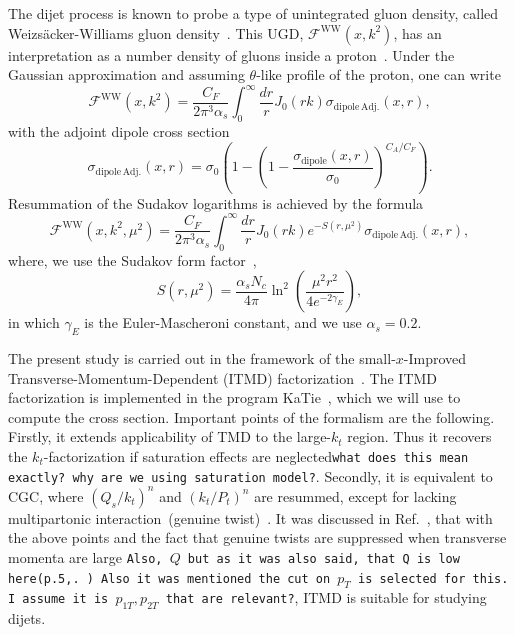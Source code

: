 \documentclass[12pt]{article}
\numberwithin{equation}{section}
\numberwithin{table}{section}
\numberwithin{figure}{section}
\newcommand{\fww}[0]{\mathcal{F}^{\mathrm{WW}}}
\newcommand{\sdp}[0]{\sigma_{\mathrm{dipole}}}
\newcommand{\sdpa}[0]{\sigma_{\mathrm{dipole\,Adj.}}}
\newcommand{\comment}[1]{\texttt{\color{red}#1}}
\begin{document}
The dijet process is known to probe a type of unintegrated gluon density, called Weizs\"acker-Williams gluon density~\cite{Dominguez:2010xd,Dominguez:2011wm,Xiao:2017ggh}.
This UGD, $\fww(x,k^2)$, has an interpretation as a number density of gluons inside a proton~\cite{Dominguez:2010xd,Dominguez:2011wm}. Under the Gaussian approximation and assuming $\theta$-like profile of the proton, one can write~\cite{vanHameren:2016ftb,Xiao:2017ggh,Dominguez:2010xd,Dominguez:2011wm}
\begin{equation}
\fww(x,k^2)= \frac{C_F}{2\pi^3\alpha_s}\int^\infty_0\frac{dr}{r}J_0(r k) \sdpa(x,r),
\end{equation} 	
with the adjoint dipole cross section
\begin{equation}
\sdpa(x,r)=\sigma_0\left( 1-\left(1-\frac{\sdp(x,r)}{\sigma_0}\right)^{C_A/C_F}\right).
\label{eq:ww}
\end{equation}
Resummation of the Sudakov logarithms is achieved by the formula~\cite{Xiao:2017yya}
\begin{equation}
	\fww(x,k^2,\mu^2)= \frac{C_F}{2\pi^3\alpha_s}\int^\infty_0\frac{dr}{r}J_0(r k) e^{-S(r,\mu^2)} \sdpa(x,r),
	\label{eq:ww-sud}
\end{equation}
where, we use the Sudakov form factor~\cite{Mueller:2013wwa,Xiao:2017yya},
\begin{equation}
	S(r,\mu^2)=\frac{\alpha_s N_c}{4\pi}\ln^2\left(\frac{\mu^2r^2}{4e^{-2\gamma_E}}\right),
\end{equation}
in which $\gamma_E$ is the Euler-Mascheroni constant, and we use $\alpha_s=0.2$. 
 

  
The present study is carried out in the framework of the small-$x$-Improved Transverse-Momentum-Dependent (ITMD) factorization~\cite{Kotko:2015ura,vanHameren:2016ftb}.
The ITMD factorization is implemented in the program KaTie~\cite{vanHameren:2016kkz}, which we will use to compute the cross section. Important points of the formalism are the following. Firstly, it extends applicability of TMD to the large-$k_t$ region. Thus it recovers the $k_t$-factorization if saturation effects are neglected\comment{what does this mean exactly? why are we using saturation model?}. Secondly, it is equivalent to CGC, where $(Q_s/k_t)^n$ and $(k_t/P_t)^n$ are resummed, except for lacking multipartonic interaction~(genuine twist)~\cite{vanHameren:2016kkz,Altinoluk:2019fui}. It was discussed in Ref.~\cite{vanHameren:2021sqc}, that with the above points and the fact that genuine twists are suppressed when transverse momenta are large \comment{Also, $Q$ but as it was also said, that Q is low here(p.5,\cite{vanHameren:2021sqc}. )  Also it was mentioned the cut on $p_T$ is selected for this. I assume it is $p_{1T}, p_{2T}$ that are relevant?}, ITMD is suitable for studying dijets.
\end{document}
